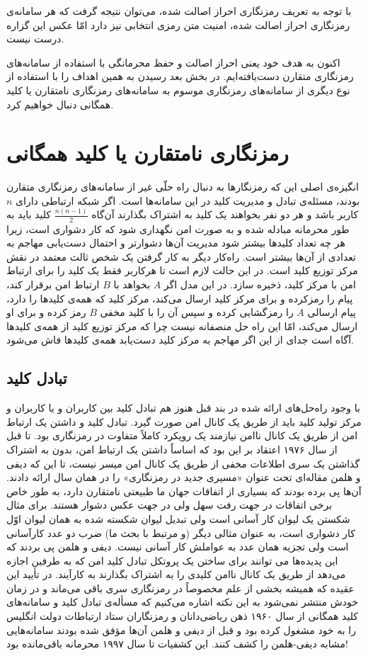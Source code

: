 با توجه  به تعریف رمزنگاری احراز اصالت شده، می‌توان نتیجه گرفت که هر سامانه‌ی رمزنگاری احراز اصالت شده، امنیت متن رمزی انتخابی نیز دارد امّا عکس این گزاره درست نیست. 

اکنون به هدف خود یعنی احراز اصالت و حفظ محرمانگی با استفاده از سامانه‌های رمزنگاری متقارن دست‌یافته‌ایم. در بخش بعد رسیدن به همین اهداف را با استفاده از نوع دیگری از سامانه‌های رمزنگاری موسوم به سامانه‌های رمزنگاری نامتقارن یا کلید همگانی دنبال خواهیم کرد.
\section{رمزنگاری نامتقارن یا کلید همگانی}
انگیزه‌ی اصلی  این که رمزنگارها به دنبال راه حلّی غیر از سامانه‌های رمزنگاری متقارن بودند، مسئله‌ی تبادل و مدیریت کلید در این سامانه‌ها است. اگر شبکه‌  ارتباطی دارای 
$n$
کاربر باشد و هر دو نفر بخواهند یک کلید به اشتراک بگذارند آن‌گاه 
$\frac{n(n-1)}{2}$
کلید باید به طور محرمانه مبادله شده و به صورت امن نگهداری شود که کار دشواری است، زیرا هر چه تعداد کلید‌ها بیشتر شود  مدیریت آن‌ها دشوارتر و احتمال دست‌یابی مهاجم به تعدادی از آن‌ها بیشتر است. راه‌کار دیگر به کار گرفتن یک شخص ثالث معتمد
در نقش مرکز توزیع کلید است.  در این حالت لازم است تا هرکاربر فقط یک کلید را برای ارتباط امن با مرکز کلید، ذخیره سازد. در این مدل اگر 
$A$
بخواهد با 
$B$
ارتباط امن برقرار کند، پیام را رمزکرده و برای مرکز کلید ارسال می‌کند، مرکز کلید که همه‌ی کلید‌ها را دارد، پیام ارسالی
$A$
را  رمزگشایی کرده و سپس آن را با کلید مخفی 
$B$
رمز کرده و برای او ارسال می‌کند، امّا این راه حل منصفانه نیست چرا که مرکز توزیع کلید از همه‌ی کلید‌ها آگاه است جدای از این اگر مهاجم به مرکز کلید دست‌یابد همه‌ی کلید‌ها فاش می‌شود.
\subsection*{تبادل کلید}
با وجود راه‌حل‌های ارائه شده در بند قبل هنوز هم تبادل کلید بین کاربران و یا کاربران و مرکز تولید کلید باید از طریق یک کانال امن صورت گیرد. تبادل کلید و داشتن یک ارتباط امن از طریق یک کانال ناامن نیازمند یک رویکرد کاملاً متفاوت در رمزنگاری بود. تا قبل از سال ۱۹۷۶ اعتقاد بر این بود که اساساً داشتن یک ارتباط امن، بدون به اشتراک گذاشتن یک سری اطلاعات مخفی از طریق یک کانال امن میسر نیست، تا این که دیفی 
و هلمن 
مقاله‌ای تحت عنوان «مسیری جدید در رمزنگاری» را در همان سال ارائه دادند. آن‌ها پی برده بودند که بسیاری از اتفاقات جهان ما طبیعتی نامتقارن دارد، به طور خاص برخی اتفاقات در جهت رفت سهل ولی در جهت عکس دشوار هستند. برای مثال شکستن یک لیوان کار آسانی است ولی تبدیل لیوان شکسته شده به همان لیوان اوّل کار دشواری است، به عنوان مثالی دیگر (و مرتبط با بحث ما) ضرب دو عدد کارآسانی است ولی تجزیه همان عدد  به عواملش کار آسانی نیست. دیفی و هلمن پی‌ بردند که این پدیده‌ها می توانند برای ساختن یک پروتکل تبادل کلید امن که به طرفین اجازه می‌دهد از طریق یک کانال ناامن کلیدی را به اشتراک بگذارند به کارآیند. در تأیید این عقیده که همیشه بخشی از علم مخصوصاً در رمزنگاری سری باقی می‌ماند و در زمان خودش منتشر نمی‌شود به این نکته اشاره می‌کنیم که مسأله‌ی تبادل کلید و سامانه‌های کلید همگانی از سال ۱۹۶۰ ذهن ریاضی‌دانان و رمزنگاران ستاد ارتباطات دولت انگلیس 
را به خود مشغول کرده بود و قبل از دیفی و هلمن آن‌ها مؤفق شده بودند سامانه‌هایی مشابه دیفی-هلمن را کشف کنند. این کشفیات تا سال ۱۹۹۷ محرمانه باقی‌مانده بود!
